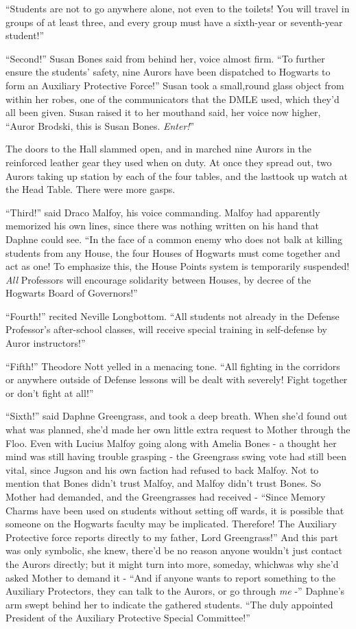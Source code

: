 ``Students are not to go anywhere alone, not even to the toilets! You will travel in groups of at least three, and every group must have a sixth-year or seventh-year student!''

``Second!'' Susan Bones said from behind her, voice almost firm. ``To further ensure the students' safety, nine Aurors have been dispatched to Hogwarts to form an Auxiliary Protective Force!'' Susan took a small,round glass object from within her robes, one of the communicators that the DMLE used, which they'd all been given. Susan raised it to her mouthand said, her voice now higher, ``Auror Brodski, this is Susan Bones. \emph{Enter!}''

The doors to the Hall slammed open, and in marched nine Aurors in the reinforced leather gear they used when on duty. At once they spread out, two Aurors taking up station by each of the four tables, and the lasttook up watch at the Head Table. There were more gasps.

``Third!'' said Draco Malfoy, his voice commanding. Malfoy had apparently memorized his own lines, since there was nothing written on his hand that Daphne could see. ``In the face of a common enemy who does not balk at killing students from any House, the four Houses of Hogwarts must come together and act as one! To emphasize this, the House Points system is temporarily suspended! \emph{All} Professors will encourage solidarity between Houses, by decree of the Hogwarts Board of Governors!''

``Fourth!'' recited Neville Longbottom. ``All students not already in the Defense Professor's after-school classes, will receive special training in self-defense by Auror instructors!''

``Fifth!'' Theodore Nott yelled in a menacing tone. ``All fighting in the corridors or anywhere outside of Defense lessons will be dealt with severely! Fight together or don't fight at all!''

``Sixth!'' said Daphne Greengrass, and took a deep breath. When she'd found out what was planned, she'd made her own little extra request to Mother through the Floo. Even with Lucius Malfoy going along with Amelia Bones - a thought her mind was still having trouble grasping - the Greengrass swing vote had still been vital, since Jugson and his own faction had refused to back Malfoy. Not to mention that Bones didn't trust Malfoy, and Malfoy didn't trust Bones. So Mother had demanded, and the Greengrasses had received - ``Since Memory Charms have been used on students without setting off wards, it is possible that someone on the Hogwarts faculty may be implicated. Therefore! The Auxiliary Protective force reports directly to my father, Lord Greengrass!'' And this part was only symbolic, she knew, there'd be no reason anyone wouldn't just contact the Aurors directly; but it might turn into more, someday, whichwas why she'd asked Mother to demand it - ``And if anyone wants to report something to the Auxiliary Protectors, they can talk to the Aurors, or go through \emph{me} -'' Daphne's arm swept behind her to indicate the gathered students. ``The duly appointed President of the Auxiliary Protective Special Committee!''

